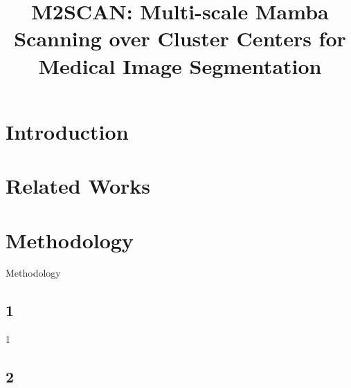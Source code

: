 \documentclass[runningheads]{llncs}
\begin{document}
%
\title{M2SCAN: Multi-scale Mamba Scanning over Cluster Centers for Medical Image Segmentation}

%
%
%
%
%
\maketitle              %
%




\begin{abstract}

\keywords{}
\end{abstract}



\section{Introduction}



\section{Related Works}





\section{Methodology}

Methodology

\subsection{1}

1

\subsection{2}
\end{document}

